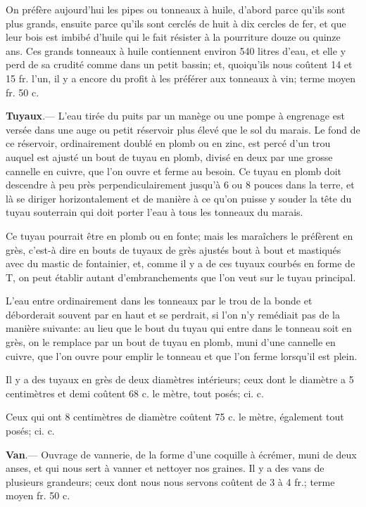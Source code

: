 \documentclass[10pt,a4paper]{book}
\begin{document}
On préfère aujourd'hui les pipes ou tonneaux à huile, d'abord parce qu'ils sont plus grands, ensuite parce qu'ils sont cerclés de huit à dix cercles de fer, et que leur bois est imbibé d'huile qui le fait résister à la pourriture douze ou quinze ans. Ces grands tonneaux à huile contiennent environ 540 litres d'eau, et elle y perd de sa crudité comme dans un petit bassin; et, quoiqu'ils nous coûtent 14 et 15 fr. l'un, il y a encore du profit à les préférer aux tonneaux à vin; terme moyen fr. 50 c.

\textbf{Tuyaux}.--- L'eau tirée du puits par un manège ou une pompe à engrenage est versée dans une auge ou petit réservoir plus élevé que le sol du marais. Le fond de ce réservoir, ordinairement doublé en plomb ou en zinc, est percé d'un trou auquel est ajusté un bout de tuyau en plomb, divisé en deux par une grosse cannelle en cuivre, que l'on ouvre et ferme au besoin. Ce tuyau en plomb doit descendre à peu près perpendiculairement jusqu'à 6 ou 8 pouces dans la terre, et là se diriger horizontalement et de manière à ce qu'on puisse y souder la tête du tuyau souterrain qui doit porter l'eau à tous les tonneaux du marais.

Ce tuyau pourrait être en plomb ou en fonte; mais les maraîchers le préfèrent en grès, c'est-à dire en bouts de tuyaux de grès ajustés bout à bout et mastiqués avec du mastic de fontainier, et, comme il y a de ces tuyaux courbés en forme de T, on peut établir autant d'embranchements que l'on veut sur le tuyau principal.

L'eau entre ordinairement dans les tonneaux par le trou de la bonde et déborderait souvent par en haut et se perdrait, si l'on n'y remédiait pas de la manière suivante: au lieu que le bout du tuyau qui entre dans le tonneau soit en grès, on le remplace par un bout de tuyau en plomb, muni d'une cannelle en cuivre, que l'on ouvre pour emplir le tonneau et que l'on ferme lorsqu'il est plein.

Il y a des tuyaux en grès de deux diamètres intérieurs; ceux dont le diamètre a 5 centimètres et demi coûtent 68 c. le mètre, tout posés; ci. c.

Ceux qui ont 8 centimètres de diamètre coûtent 75 c. le mètre, également tout posés; ci. c.

\textbf{Van}.--- Ouvrage de vannerie, de la forme d'une coquille à écrémer, muni de deux anses, et qui nous sert à vanner et nettoyer nos graines. Il y a des vans de plusieurs grandeurs; ceux dont nous nous servons coûtent de 3 à 4 fr.; terme moyen  fr. 50 c.
\end{document}
